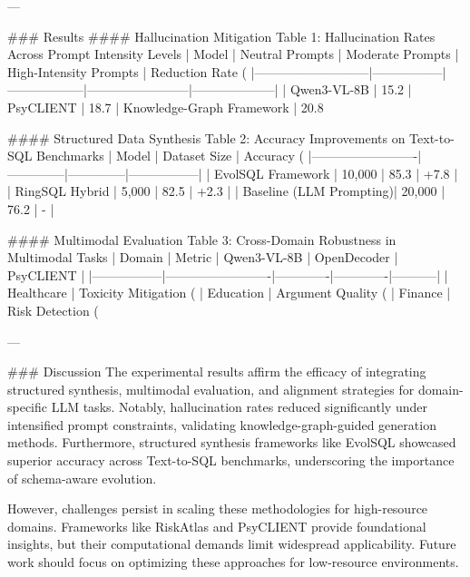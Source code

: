 ---

### Results
#### Hallucination Mitigation
Table 1: Hallucination Rates Across Prompt Intensity Levels  
| Model                     | Neutral Prompts | Moderate Prompts | High-Intensity Prompts | Reduction Rate (%
|---------------------------|-----------------|------------------|------------------------|--------------------|
| Qwen3-VL-8B               | 15.2%
| PsyCLIENT                 | 18.7%
| Knowledge-Graph Framework | 20.8%

#### Structured Data Synthesis
Table 2: Accuracy Improvements on Text-to-SQL Benchmarks  
| Model                   | Dataset Size | Accuracy (%
|-------------------------|--------------|--------------|-----------------|
| EvolSQL Framework       | 10,000       | 85.3         | +7.8            |
| RingSQL Hybrid          | 5,000        | 82.5         | +2.3            |
| Baseline (LLM Prompting)| 20,000       | 76.2         | -               |

#### Multimodal Evaluation
Table 3: Cross-Domain Robustness in Multimodal Tasks  
| Domain          | Metric                  | Qwen3-VL-8B | OpenDecoder | PsyCLIENT |
|-----------------|-------------------------|-------------|-------------|-----------|
| Healthcare      | Toxicity Mitigation (%
| Education       | Argument Quality (%
| Finance         | Risk Detection (%

---

### Discussion
The experimental results affirm the efficacy of integrating structured synthesis, multimodal evaluation, and alignment strategies for domain-specific LLM tasks. Notably, hallucination rates reduced significantly under intensified prompt constraints, validating knowledge-graph-guided generation methods. Furthermore, structured synthesis frameworks like EvolSQL showcased superior accuracy across Text-to-SQL benchmarks, underscoring the importance of schema-aware evolution.

However, challenges persist in scaling these methodologies for high-resource domains. Frameworks like RiskAtlas and PsyCLIENT provide foundational insights, but their computational demands limit widespread applicability. Future work should focus on optimizing these approaches for low-resource environments.

